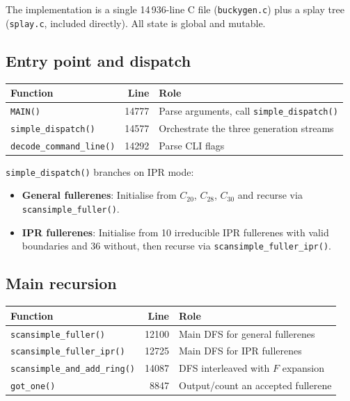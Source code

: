 \documentclass[11pt,a4paper]{article}
\theoremstyle{definition}
\begin{document}
The implementation is a single 14\,936-line C file
(\texttt{buckygen.c}) plus a splay tree (\texttt{splay.c}, included
directly).  All state is global and mutable.

\subsection{Entry point and dispatch}

\begin{center}
\begin{tabular}{lrl}
Function & Line & Role \\
\hline
\texttt{MAIN()} & 14777 & Parse arguments, call \texttt{simple\_dispatch()} \\
\texttt{simple\_dispatch()} & 14577 & Orchestrate the three generation streams \\
\texttt{decode\_command\_line()} & 14292 & Parse CLI flags \\
\end{tabular}
\end{center}

\texttt{simple\_dispatch()} branches on IPR mode:
\begin{itemize}[nosep]
  \item \textbf{General fullerenes}: Initialise from $C_{20}$, $C_{28}$,
    $C_{30}$ and recurse via \texttt{scansimple\_fuller()}.
  \item \textbf{IPR fullerenes}: Initialise from 10 irreducible IPR
    fullerenes with valid boundaries and 36 without, then recurse via
    \texttt{scansimple\_fuller\_ipr()}.
\end{itemize}

\subsection{Main recursion}

\begin{center}
\begin{tabular}{lrl}
Function & Line & Role \\
\hline
\texttt{scansimple\_fuller()} & 12100 & Main DFS for general fullerenes \\
\texttt{scansimple\_fuller\_ipr()} & 12725 & Main DFS for IPR fullerenes \\
\texttt{scansimple\_and\_add\_ring()} & 14087 & DFS interleaved with $F$ expansion \\
\texttt{got\_one()} & 8847 & Output/count an accepted fullerene \\
\end{tabular}
\end{center}
\end{document}

